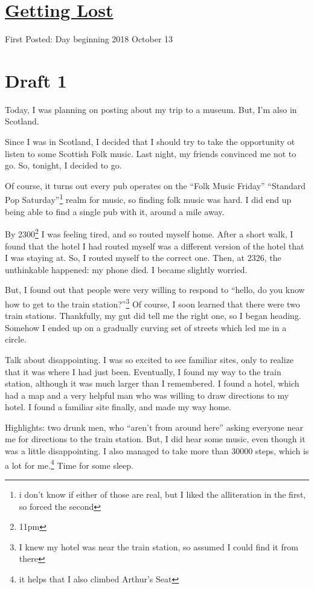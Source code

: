\documentclass[12pt]{article}[titlepage]
\newcommand{\say}[1]{``#1''}
\newcommand{\1}{\={a}}
\newcommand{\2}{\={e}}
\newcommand{\3}{\={\i}}
\newcommand{\4}{\=o}
\newcommand{\5}{\=u}
\newcommand{\6}{\={A}}
\renewcommand{\,}{\textsuperscript{,}}
\begin{document}
\doublespacing
\section{\href{getting-lost.html}{Getting Lost}}
First Posted: Day beginning 2018 October 13
\section{Draft 1}
Today, I was planning on posting about my trip to a museum.
But, I'm also in Scotland.

Since I was in Scotland, I decided that I should try to take the opportunity ot listen to some Scottish Folk music.
Last night, my friends convinced me not to go.
So, tonight, I decided to go.

Of course, it turns out every pub operates on the \say{Folk Music Friday} \say{Standard Pop Saturday}\footnote{i don't know if either of those are real, but I liked the alliteration in the first, so forced the second} realm for music, so finding folk music was hard.
I did end up being able to find a single pub with it, around a mile away.

By 2300\footnote{11pm} I was feeling tired, and so routed myself home.
After a short walk, I found that the hotel I had routed myself was a different version of the hotel that I was staying at.
So, I routed myself to the correct one.
Then, at 2326, the unthinkable happened: my phone died.
I became slightly worried.

But, I found out that people were very willing to respond to \say{hello, do you know how to get to the train station?}\footnote{I knew my hotel was near the train station, so assumed I could find it from there}
Of course, I soon learned that there were two train stations.
Thankfully, my gut did tell me the right one, so I began heading.
Somehow I ended up on a gradually curving set of streets which led me in a circle.

Talk about disappointing.
I was so excited to see familiar sites, only to realize that it was where I had just been.
Eventually, I found my way to the train station, although it was much larger than I remembered.
I found a hotel, which had a map and a very helpful man who was willing to draw directions to my hotel.
I found a familiar site finally, and made my way home.

Highlights: two drunk men, who \say{aren't from around here} asking everyone near me for directions to the train station.
But, I did hear some music, even though it was a little disappointing.
I also managed to take more than 30000 steps, which is a lot for me.\footnote{it helps that I also climbed Arthur's Seat} 
Time for some sleep.
\end{document}
